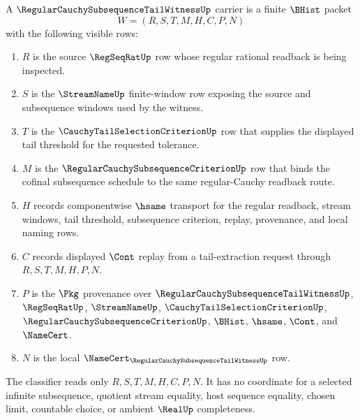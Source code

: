 \begin{definition}
\label{def:regular-cauchy-subsequence-tail-witness-carrier}
A $\RegularCauchySubsequenceTailWitnessUp$ carrier is a finite $\BHist$ packet
$$
W=(R,S,T,M,H,C,P,N)
$$
with the following visible rows:
\begin{enumerate}
\item $R$ is the source $\RegSeqRatUp$ row whose regular rational readback is being inspected.
\item $S$ is the $\StreamNameUp$ finite-window row exposing the source and subsequence windows used by the witness.
\item $T$ is the $\CauchyTailSelectionCriterionUp$ row that supplies the displayed tail threshold for the requested tolerance.
\item $M$ is the $\RegularCauchySubsequenceCriterionUp$ row that binds the cofinal subsequence schedule to the same regular-Cauchy readback route.
\item $H$ records componentwise $\hsame$ transport for the regular readback, stream windows, tail threshold, subsequence criterion, replay, provenance, and local naming rows.
\item $C$ records displayed $\Cont$ replay from a tail-extraction request through $R,S,T,M,H,P,N$.
\item $P$ is the $\Pkg$ provenance over $\RegularCauchySubsequenceTailWitnessUp$, $\RegSeqRatUp$, $\StreamNameUp$, $\CauchyTailSelectionCriterionUp$, $\RegularCauchySubsequenceCriterionUp$, $\BHist$, $\hsame$, $\Cont$, and $\NameCert$.
\item $N$ is the local $\NameCert_{\RegularCauchySubsequenceTailWitnessUp}$ row.
\end{enumerate}
The classifier reads only $R,S,T,M,H,C,P,N$. It has no coordinate for a selected infinite subsequence, quotient stream equality, host sequence equality, chosen limit, countable choice, or ambient $\RealUp$ completeness.
\end{definition}

